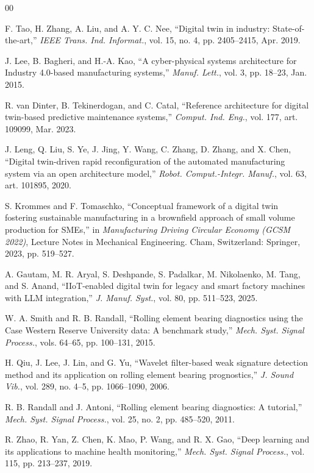 \documentclass[conference]{IEEEtran}
\begin{document}
\begin{thebibliography}{00}

F. Tao, H. Zhang, A. Liu, and A. Y. C. Nee, ``Digital twin in industry:
State-of-the-art,'' \textit{IEEE Trans. Ind. Informat.}, vol. 15, no. 4,
pp. 2405--2415, Apr. 2019.

J. Lee, B. Bagheri, and H.-A. Kao, ``A cyber-physical systems architecture
for Industry 4.0-based manufacturing systems,'' \textit{Manuf. Lett.},
vol. 3, pp. 18--23, Jan. 2015.

R. van Dinter, B. Tekinerdogan, and C. Catal, ``Reference architecture for
digital twin-based predictive maintenance systems,'' \textit{Comput. Ind.
Eng.}, vol. 177, art. 109099, Mar. 2023.

J. Leng, Q. Liu, S. Ye, J. Jing, Y. Wang, C. Zhang, D. Zhang, and X. Chen,
``Digital twin-driven rapid reconfiguration of the automated manufacturing
system via an open architecture model,'' \textit{Robot. Comput.-Integr.
Manuf.}, vol. 63, art. 101895, 2020.

S. Krommes and F. Tomaschko, ``Conceptual framework of a digital twin
fostering sustainable manufacturing in a brownfield approach of small volume
production for SMEs,'' in \textit{Manufacturing Driving Circular Economy
(GCSM 2022)}, Lecture Notes in Mechanical Engineering. Cham, Switzerland:
Springer, 2023, pp. 519--527.

A. Gautam, M. R. Aryal, S. Deshpande, S. Padalkar, M. Nikolaenko, M. Tang,
and S. Anand, ``IIoT-enabled digital twin for legacy and smart factory
machines with LLM integration,'' \textit{J. Manuf. Syst.}, vol. 80,
pp. 511--523, 2025.

W. A. Smith and R. B. Randall, ``Rolling element bearing diagnostics using
the Case Western Reserve University data: A benchmark study,'' \textit{Mech.
Syst. Signal Process.}, vols. 64--65, pp. 100--131, 2015.

H. Qiu, J. Lee, J. Lin, and G. Yu, ``Wavelet filter-based weak signature
detection method and its application on rolling element bearing
prognostics,'' \textit{J. Sound Vib.}, vol. 289, no. 4--5, pp. 1066--1090,
2006.

R. B. Randall and J. Antoni, ``Rolling element bearing diagnostics: A
tutorial,'' \textit{Mech. Syst. Signal Process.}, vol. 25, no. 2,
pp. 485--520, 2011.

R. Zhao, R. Yan, Z. Chen, K. Mao, P. Wang, and R. X. Gao, ``Deep learning
and its applications to machine health monitoring,'' \textit{Mech. Syst.
Signal Process.}, vol. 115, pp. 213--237, 2019.


\end{thebibliography}
\end{document}
